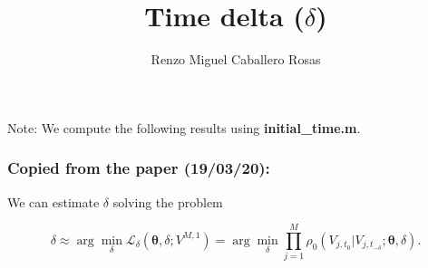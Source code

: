 \documentclass[aspectratio=169]{beamer}\usepackage[utf8]{inputenc}
\title{Time delta ($\delta$)}
\subtitle{Renzo Miguel Caballero Rosas}
\begin{document}
\begin{frame}
\titlepage
{\tiny Note: We compute the following results using \textbf{initial\_time.m}.}
\end{frame}


%
%


\begin{frame}\frametitle{\alert{\textbf{Copied from the paper (19/03/20):}}}

We can estimate $\delta$ solving the problem

\begin{equation*}
\delta\approx\arg\min_{\delta}\mathcal{L}_{\delta}(\bm{\theta},\delta; V^{M,1}) = \arg\min_{\delta}\prod\limits_{j=1}^M \rho_0 (V_{j, t_0}|V_{j, t_{-\delta}};\bm{\theta},\delta).
\end{equation*}

\end{frame}
\end{document}
